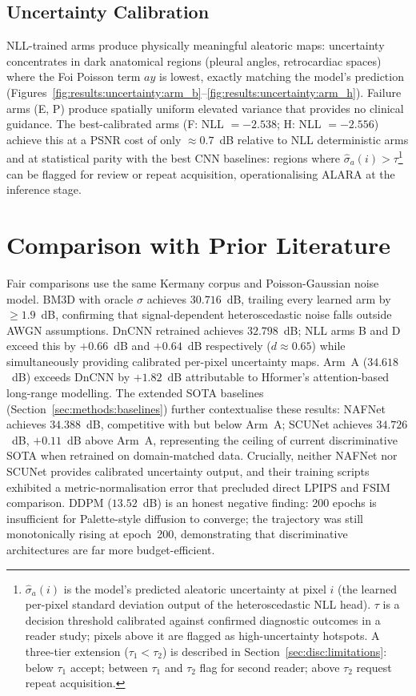 \documentclass[12pt, a4paper, twoside, openright]{book}
\begin{document}
\subsection{Uncertainty Calibration}
\label{sec:disc:findings:calibration}

NLL-trained arms produce physically meaningful aleatoric maps: uncertainty concentrates in dark anatomical regions (pleural angles, retrocardiac spaces) where the Foi Poisson term $ay$ is lowest, exactly matching the model's prediction (Figures~\ref{fig:results:uncertainty:arm_b}--\ref{fig:results:uncertainty:arm_h}). Failure arms (E, P) produce spatially uniform elevated variance that provides no clinical guidance. The best-calibrated arms (F: NLL $=-2.538$; H: NLL $=-2.556$) achieve this at a PSNR cost of only $\approx 0.7$~dB relative to NLL deterministic arms and at statistical parity with the best CNN baselines: regions where $\hat{\sigma}_a(i)>\tau$\footnote{$\hat{\sigma}_a(i)$ is the model's predicted aleatoric uncertainty at pixel $i$ (the learned per-pixel standard deviation output of the heteroscedastic NLL head). $\tau$ is a decision threshold calibrated against confirmed diagnostic outcomes in a reader study; pixels above it are flagged as high-uncertainty hotspots. A three-tier extension ($\tau_1 < \tau_2$) is described in Section~\ref{sec:disc:limitations}: below $\tau_1$ accept; between $\tau_1$ and $\tau_2$ flag for second reader; above $\tau_2$ request repeat acquisition.} can be flagged for review or repeat acquisition, operationalising ALARA at the inference stage.

\section{Comparison with Prior Literature}
\label{sec:disc:lit}

Fair comparisons use the same Kermany corpus and Poisson-Gaussian noise model. BM3D with oracle $\sigma$ achieves $30.716$~dB, trailing every learned arm by $\geq 1.9$~dB, confirming that signal-dependent heteroscedastic noise falls outside AWGN assumptions. DnCNN retrained achieves $32.798$~dB; NLL arms B and D exceed this by $+0.66$~dB and $+0.64$~dB respectively ($d\approx0.65$) while simultaneously providing calibrated per-pixel uncertainty maps. Arm~A ($34.618$~dB) exceeds DnCNN by $+1.82$~dB attributable to Hformer's attention-based long-range modelling. The extended SOTA baselines (Section~\ref{sec:methods:baselines}) further contextualise these results: NAFNet \cite{chen_nafnet_2022} achieves $34.388$~dB, competitive with but below Arm~A; SCUNet \cite{zhang_scunet_2023} achieves $34.726$~dB, $+0.11$~dB above Arm~A, representing the ceiling of current discriminative SOTA when retrained on domain-matched data. Crucially, neither NAFNet nor SCUNet provides calibrated uncertainty output, and their training scripts exhibited a metric-normalisation error that precluded direct LPIPS and FSIM comparison. DDPM ($13.52$~dB) is an honest negative finding: 200 epochs is insufficient for Palette-style diffusion to converge; the trajectory was still monotonically rising at epoch~200, demonstrating that discriminative architectures are far more budget-efficient.
\end{document}
